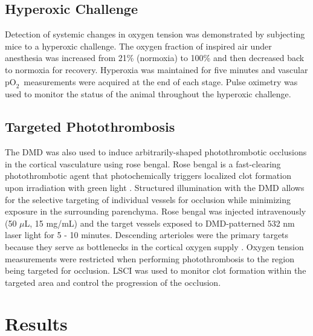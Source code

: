 \documentclass[12pt]{spieman}  %
\newcommand{\pO}{\ensuremath{\text{pO}_2}} 	            %
\begin{document}
\begin{spacing}{2}

\subsection{Hyperoxic Challenge}
Detection of systemic changes in oxygen tension was demonstrated by subjecting mice to a hyperoxic challenge. The oxygen fraction of inspired air under anesthesia was increased from 21\% (normoxia) to 100\% and then decreased back to normoxia for recovery. Hyperoxia was maintained for five minutes and vascular \pO\ measurements were acquired at the end of each stage. Pulse oximetry was used to monitor the status of the animal throughout the hyperoxic challenge.


\subsection{Targeted Photothrombosis}
The DMD was also used to induce arbitrarily-shaped photothrombotic occlusions in the cortical vasculature using rose bengal. Rose bengal is a fast-clearing photothrombotic agent that photochemically triggers localized clot formation upon irradiation with green light \cite{Watson:1985bp,Klaassen:1976kg,Wilson:1991tv}. Structured illumination with the DMD allows for the selective targeting of individual vessels for occlusion while minimizing exposure in the surrounding parenchyma. Rose bengal was injected intravenously (50 $\mu$L, 15 mg/mL) and the target vessels exposed to DMD-patterned 532 nm laser light for 5 - 10 minutes. Descending arterioles were the primary targets because they serve as bottlenecks in the cortical oxygen supply \cite{Nishimura:2007hk}. Oxygen tension measurements were restricted when performing photothrombosis to the region being targeted for occlusion. LSCI was used to monitor clot formation within the targeted area and control the progression of the occlusion.


\section{Results}
\label{sect:results}


\end{spacing}
\end{document}
